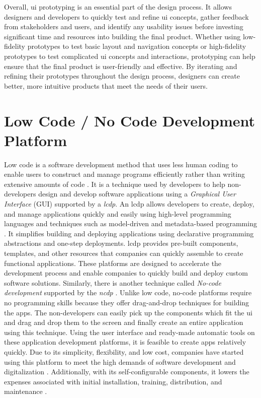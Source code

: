 Overall, \ac{ui} prototyping is an essential part of the design process. 
It allows designers and developers to quickly test and refine \ac{ui} concepts, gather feedback from stakeholders and users, and identify any usability issues before investing significant time and resources into building the final product. 
Whether using low-fidelity prototypes to test basic layout and navigation concepts or high-fidelity prototypes to test complicated \ac{ui} concepts and interactions, prototyping can help ensure that the final product is user-friendly and effective. 
By iterating and refining their prototypes throughout the design process, designers can create better, more intuitive products that meet the needs of their users. 
\clearpage


\section{Low Code / No Code Development Platform}
\label{background:section:lowcode}
Low code is a software development method that uses less human coding to enable users to construct and manage programs efficiently rather than writing extensive amounts of code \cite{article:nocode:sahina}.
It is a technique used by developers to help non-developers design and develop software applications using a \textit{Graphical User Interface} (GUI) supported by a \textit{\ac{lcdp}}.
An \ac{lcdp} allows developers to create, deploy, and manage applications quickly and easily using high-level programming languages and techniques such as model-driven and metadata-based programming \cite{misc:lowcode:platforms}.
It simplifies building and deploying applications using declarative programming abstractions and one-step deployments.
\ac{lcdp} provides pre-built components, templates, and other resources that companies can quickly assemble to create functional applications.
These platforms are designed to accelerate the development process and enable companies to quickly build and deploy custom software solutions.
Similarly, there is another technique called \textit{No-code development} supported by the \textit{\ac{ncdp}} \cite{article:nocode:miller}.
Unlike low code, no-code platforms require no programming skills because they offer drag-and-drop techniques for building the apps.
The non-developers can easily pick up the components which fit the \ac{ui} and drag and drop them to the screen and finally create an entire application using this technique.
Using the user interface and ready-made automatic tools on these application development platforms, it is feasible to create apps relatively quickly. 
Due to its simplicity, flexibility, and low cost, companies have started using this platform to meet the high demands of software development and digitalization \cite{article:nocode:sahina}.
Additionally, with its self-configurable components, it lowers the expenses associated with initial installation, training, distribution, and maintenance \cite{article:nocode:sanchi}.

